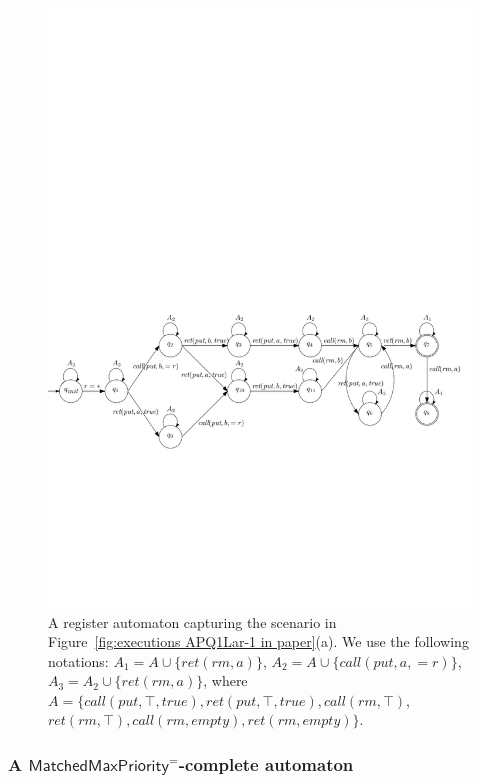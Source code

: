 \begin{figure}[t]
  \centering
  \includegraphics[width=.9\textwidth]{figures/PIC_AUTO_PQ1Lar-pprr.pdf}
  \caption{A register automaton capturing the scenario in Figure~\ref{fig:executions APQ1Lar-1 in paper}(a). We use the following notations: $A_1 = A \cup \{ \textit{ret}(\textit{rm},a) \}$, $A_2 = A \cup \{ \textit{call}(\textit{put},a,=r) \}$, $A_3 = A_2 \cup \{ \textit{ret}(\textit{rm},a) \}$, where $A = \{ \textit{call}(\textit{put},\top,\textit{true}),\textit{ret}(\textit{put},\top,\textit{true}), \textit{call}(\textit{rm},\top)$, $\textit{ret}(\textit{rm},\top),\textit{call}(\textit{rm},\textit{empty}),\textit{ret}(\textit{rm},\textit{empty}) \}$.}
  \label{fig:automata APQ1Lar-1 in paper}
\end{figure}





\subsubsection{A $\mathsf{MatchedMaxPriority}^=$-complete automaton}
\label{subsec:co-regular of EPQ1Equal}

